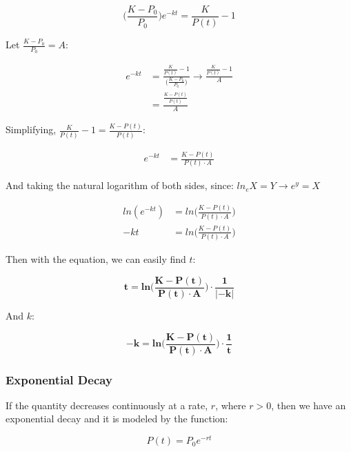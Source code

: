 \documentclass[12pt, UTF8]{article}
\begin{document}
	\begin{equation}
		\Big(\frac{K - P_{0}}{P_{0}}\Big)e^{-kt} = \frac{K}{P(t)} - 1
	\end{equation}
	
	Let $\frac{K - P_{0}}{P_0} = A$:
	
	\begin{align}
		e^{-kt} &= \frac{\frac{K}{P(t)} - 1}{\big(\frac{K - P_{0}}{P_{0}}\big)} \longrightarrow \frac{\frac{K}{P(t)} - 1}{A} \\ 
		&= \frac{\frac{K - P(t)}{P(t)}}{A} 
	\end{align}
	
	Simplifying, $\frac{K}{P(t)} -1 = \frac{K - P(t)}{P(t)}$:
	
	\begin{align}
		e^{-kt} &= \frac{K - P(t)}{P(t) \cdot A} 
	\end{align}
	
	And taking the natural logarithm of both sides, since: $ln_{e} X = Y \longrightarrow e^{y} = X$
	
	\begin{align}
		ln(e^{-kt}) &= ln\big(\frac{K - P(t)}{P(t) \cdot A}\big)  \nonumber \\
		-kt &= ln\big(\frac{K - P(t)}{P(t) \cdot A}\big) 
	\end{align}
	
	Then with the equation, we can easily find $t$:
	
	\begin{equation}
		\boldsymbol{t} = \boldsymbol{ln\big(\frac{K - P(t)}{P(t) \cdot A}\big) \cdot \frac{1}{|-k|}}
	\end{equation}
	
	And $k$:
	
	\begin{equation}
		\boldsymbol{-k} = \boldsymbol{ln\big(\frac{K - P(t)}{P(t) \cdot A}\big) \cdot \frac{1}{t}}
	\end{equation}
	
	\subsubsection*{Exponential Decay}
	
	If the quantity decreases continuously at a rate, $r$, where $r > 0$, then we have an exponential decay and it is modeled by the function:
	
	\begin{equation}
		P(t) = P_{0} e^{-rt}
	\end{equation}
	
\end{document}
